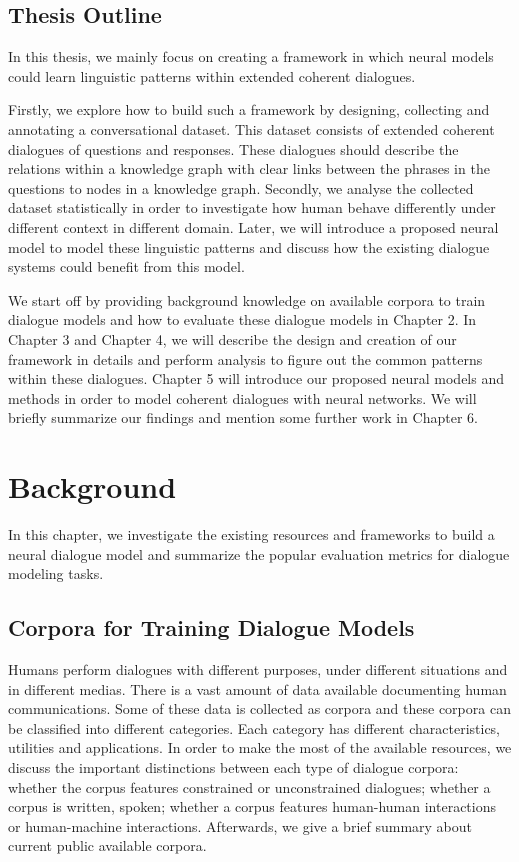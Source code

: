 \documentclass[bsc,frontabs,twoside,singlespacing,parskip,deptreport]{infthesis}     %
\begin{document}
\section {Thesis Outline}

In this thesis, we mainly focus on creating a framework in which neural models could learn linguistic patterns within extended coherent dialogues.

Firstly, we explore how to build such a framework by designing, collecting and annotating a conversational dataset. This dataset consists of extended coherent dialogues of questions and responses. These dialogues should describe the relations within a knowledge graph with clear links between the phrases in the questions to nodes in a knowledge graph. Secondly, we analyse the collected dataset statistically in order to investigate how human behave differently under different context in different domain. Later, we will introduce a proposed neural model to model these linguistic patterns and discuss how the existing dialogue systems could benefit from this model.

We start off by providing background knowledge on available corpora to train dialogue models and how to evaluate these dialogue models in Chapter 2. In Chapter 3 and Chapter 4, we will describe the design and creation of our framework in details and perform analysis to figure out the common patterns within these dialogues. Chapter 5 will introduce our proposed neural models and methods in order to model coherent dialogues with neural networks. We will briefly summarize our findings and mention some further work in Chapter 6.

\chapter{Background}

In this chapter, we investigate the existing resources and frameworks to build a neural dialogue model and summarize the popular evaluation metrics for dialogue modeling tasks.

\section{Corpora for Training Dialogue Models}

Humans perform dialogues with different purposes, under different situations and in different medias. There is a vast amount of data available documenting human communications. Some of these data is collected as corpora and these corpora can be classified into different categories. Each category has different characteristics, utilities and applications. In order to make the most of the available resources, we discuss the important distinctions between each type of dialogue corpora: whether the corpus features constrained or unconstrained dialogues; whether a corpus is written, spoken; whether a corpus features human-human interactions or human-machine interactions. Afterwards, we give a brief summary about current public available corpora.
\end{document}
